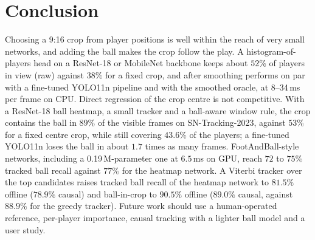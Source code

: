 \documentclass[conference]{IEEEtran}
\begin{document}
\section{Conclusion}
Choosing a 9:16 crop from player positions is well within the reach of very small networks, and adding the ball makes the crop follow the play. A histogram-of-players head on a ResNet-18 or MobileNet backbone keeps about $52\%$ of players in view (raw) against $38\%$ for a fixed crop, and after smoothing performs on par with a fine-tuned YOLO11n pipeline and with the smoothed oracle, at 8--34\,ms per frame on CPU. Direct regression of the crop centre is not competitive. With a ResNet-18 ball heatmap, a small tracker and a ball-aware window rule, the crop contains the ball in $89\%$ of the visible frames on SN-Tracking-2023, against $53\%$ for a fixed centre crop, while still covering $43.6\%$ of the players; a fine-tuned YOLO11n loses the ball in about $1.7$ times as many frames. FootAndBall-style networks, including a 0.19\,M-parameter one at $6.5$\,ms on GPU, reach $72$ to $75\%$ tracked ball recall against $77\%$ for the heatmap network. A Viterbi tracker over the top candidates raises tracked ball recall of the heatmap network to $81.5\%$ offline ($78.9\%$ causal) and ball-in-crop to $90.5\%$ offline ($89.0\%$ causal, against $88.9\%$ for the greedy tracker). Future work should use a human-operated reference, per-player importance, causal tracking with a lighter ball model and a user study.
\end{document}
